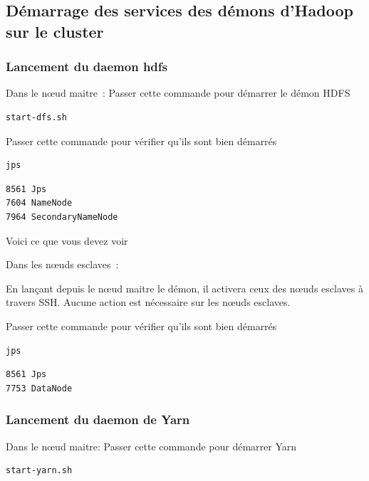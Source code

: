 \documentclass[12pt,french]{book}
\begin{document}
\subsection{Démarrage des services des démons d’Hadoop sur le cluster}

\subsubsection{Lancement du daemon hdfs}

Dans le nœud maitre :
Passer cette commande pour démarrer le démon HDFS

\begin{lstlisting}[language=bash, frame=single]
start-dfs.sh
\end{lstlisting}

Passer cette commande pour vérifier qu’ils sont bien démarrés 

\begin{lstlisting}[language=bash, frame=single]
jps
\end{lstlisting}

\begin{lstlisting}[language=bash, frame=single]
8561 Jps
7604 NameNode
7964 SecondaryNameNode
\end{lstlisting}

Voici ce que vous devez voir 

Dans les nœuds esclaves :

En lançant depuis le nœud maitre le démon, il activera ceux des nœuds esclaves à travers SSH. Aucune action est nécessaire sur les nœuds esclaves. 

Passer cette commande pour vérifier qu’ils sont bien démarrés 

\begin{lstlisting}[language=bash, frame=single]
jps
\end{lstlisting}

\begin{lstlisting}[language=bash, frame=single]
8561 Jps
7753 DataNode
\end{lstlisting}

\subsubsection{Lancement du daemon de Yarn}

Dans le nœud maitre:
Passer cette commande pour démarrer Yarn

\begin{lstlisting}[language=bash, frame=single]
start-yarn.sh
\end{lstlisting}
\end{document}
